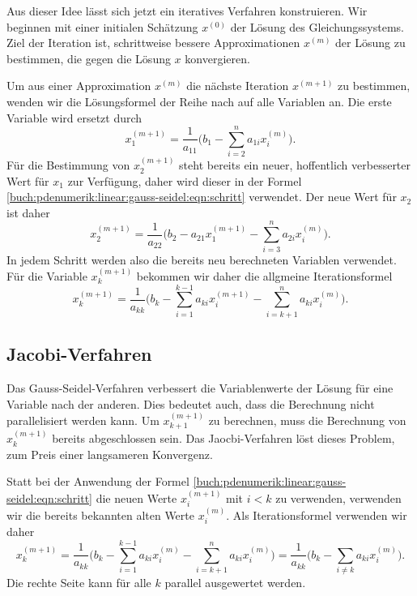Aus dieser Idee lässt sich jetzt ein iteratives Verfahren konstruieren.
Wir beginnen mit einer initialen Schätzung $x^{(0)}$ der Lösung des
Gleichungssystems.
Ziel der Iteration ist, schrittweise bessere Approximationen $x^{(m)}$
der Lösung zu bestimmen, die gegen die Lösung $x$ konvergieren.

Um aus einer Approximation $x^{(m)}$ die nächste Iteration $x^{(m+1)}$
zu bestimmen, wenden wir die Lösungsformel der Reihe nach auf alle
Variablen an.
Die erste Variable wird ersetzt durch
\[
x_1^{(m+1)}
=
\frac{1}{a_{11}}
\biggl(
b_1
-
\sum_{i=2}^n a_{1i}x_i^{(m)}
\biggr).
\]
Für die Bestimmung von $x_2^{(m+1)}$ steht bereits ein neuer,
hoffentlich verbesserter Wert für $x_1$ zur Verfügung, daher wird
dieser in der Formel \eqref{buch:pdenumerik:linear:gauss-seidel:eqn:schritt}
verwendet.
Der neue Wert für $x_2$ ist daher
\begin{equation}
x_2^{(m+1)}
=
\frac{1}{a_{22}}
\biggl(
b_2 - a_{21}x_1^{(m+1)}
-
\sum_{i=3}^n a_{2i}x_i^{(m)}
\biggr).
\end{equation}
In jedem Schritt werden also die bereits neu berechneten Variablen
verwendet.
Für die Variable $x_k^{(m+1)}$ bekommen wir daher die allgmeine
Iterationsformel
\begin{equation}
x_k^{(m+1)}
=
\frac{1}{a_{kk}}
\biggl(
b_k - \sum_{i=1}^{k-1} a_{ki}x_i^{(m+1)} - \sum_{i=k+1}^n a_{ki}x_i^{(m)}
\biggr).
\label{buch:pdenumerik:linear:gauss-seidel:iteration}
\end{equation}

%
%
\subsection{Jacobi-Verfahren
\label{buch:pdenumerik:linear:subsection:jacobi}}
Das Gauss-Seidel-Verfahren verbessert die Variablenwerte der Lösung
für eine Variable nach der anderen.
Dies bedeutet auch, dass die Berechnung nicht parallelisiert werden
kann.
Um $x_{k+1}^{(m+1)}$ zu berechnen, muss die Berechnung von $x_k^{(m+1)}$
bereits abgeschlossen sein.
Das Jaocbi-Verfahren löst dieses Problem, zum Preis einer langsameren
Konvergenz.

Statt bei der Anwendung der Formel
\eqref{buch:pdenumerik:linear:gauss-seidel:eqn:schritt}
die neuen Werte $x_i^{(m+1)}$ mit $i<k$ zu verwenden, verwenden wir
die bereits bekannten alten Werte $x_i^{(m)}$.
Als Iterationsformel verwenden wir daher
\begin{equation}
x_k^{(m+1)}
=
\frac{1}{a_{kk}}
\biggl(
b_k
-
\sum_{i=1}^{k-1} a_{ki} x_i^{(m)}
-
\sum_{i=k+1}^n a_{ki} x_i^{(m)}
\biggr)
=
\frac{1}{a_{kk}}
\biggl(
b_k
-
\sum_{i\ne k} a_{ki} x_i^{(m)}
\biggr).
\end{equation}
Die rechte Seite kann für alle $k$ parallel ausgewertet werden.

